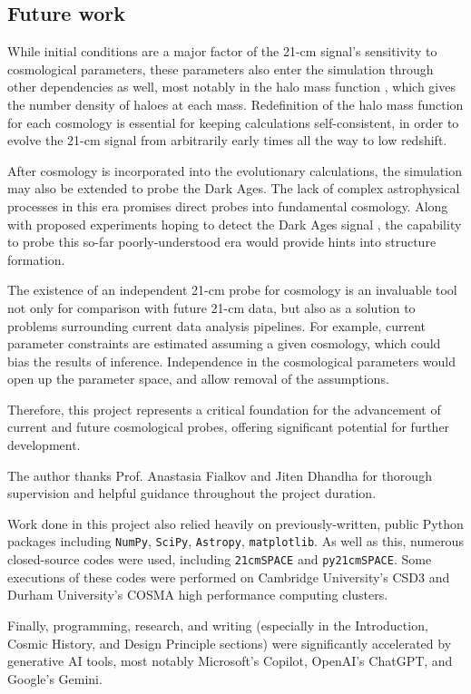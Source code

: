 \documentclass[floats,floatfix,showpacs,amssymb,prd,superscriptaddress,nofootinbib]{revtex4-2} %
\newcommand{\code}{\texttt}
\begin{document}
\subsection{Future work}
While initial conditions are a major factor of the 21-cm signal's sensitivity to cosmological parameters, these parameters also enter the simulation through other dependencies as well, most notably in the halo mass function \citep{Murray_2013, Greig_2024}, which gives the number density of haloes at each mass. Redefinition of the halo mass function for each cosmology is essential for keeping calculations self-consistent, in order to evolve the 21-cm signal from arbitrarily early times all the way to low redshift.

After cosmology is incorporated into the evolutionary calculations, the simulation may also be extended to probe the Dark Ages. The lack of complex astrophysical processes in this era promises direct probes into fundamental cosmology. Along with proposed experiments hoping to detect the Dark Ages signal \citep{Fialkov_2024}, the capability to probe this so-far poorly-understood era would provide hints into structure formation.

The existence of an independent 21-cm probe for cosmology is an invaluable tool not only for comparison with future 21-cm data, but also as a solution to problems surrounding current data analysis pipelines. For example, current parameter constraints are estimated assuming a given cosmology, which could bias the results of inference. Independence in the cosmological parameters would open up the parameter space, and allow removal of the assumptions. 

Therefore, this project represents a critical foundation for the advancement of current and future cosmological probes, offering significant potential for further development.



\begin{acknowledgments}
The author thanks Prof. Anastasia Fialkov and Jiten Dhandha for thorough supervision and helpful guidance throughout the project duration. 

Work done in this project also relied heavily on previously-written, public Python packages including \code{NumPy}, \code{SciPy}, \code{Astropy}, \code{matplotlib}. As well as this, numerous closed-source codes were used, including \code{21cmSPACE} and \code{py21cmSPACE}. Some executions of these codes were performed on Cambridge University's CSD3 and Durham University's COSMA high performance computing clusters.

Finally, programming, research, and writing (especially in the Introduction, Cosmic History, and Design Principle sections) were significantly accelerated by generative AI tools, most notably Microsoft's Copilot, OpenAI's ChatGPT, and Google's Gemini. 
\end{acknowledgments}
\end{document}
